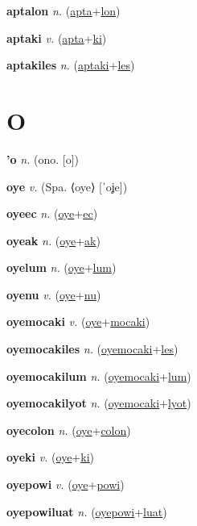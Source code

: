 \textbf{\hypertarget{aptalon}{aptalon}} \textit{n.} (\hyperlink{apta}{apta}+\allowbreak \hyperlink{lon}{lon})


\textbf{\hypertarget{aptaki}{aptaki}} \textit{v.} (\hyperlink{apta}{apta}+\allowbreak \hyperlink{ki}{ki})


\textbf{\hypertarget{aptakiles}{aptakiles}} \textit{n.} (\hyperlink{aptaki}{aptaki}+\allowbreak \hyperlink{les}{les})


\section{O}

\textbf{\hypertarget{'o}{'o}} \textit{n.} (ono. [o])


\textbf{\hypertarget{oye}{oye}} \textit{v.} (Spa. ⟨oye⟩ [ˈoʝe])


\textbf{\hypertarget{oyeec}{oyeec}} \textit{n.} (\hyperlink{oye}{oye}+\allowbreak \hyperlink{ec}{ec})


\textbf{\hypertarget{oyeak}{oyeak}} \textit{n.} (\hyperlink{oye}{oye}+\allowbreak \hyperlink{ak}{ak})


\textbf{\hypertarget{oyelum}{oyelum}} \textit{n.} (\hyperlink{oye}{oye}+\allowbreak \hyperlink{lum}{lum})


\textbf{\hypertarget{oyenu}{oyenu}} \textit{v.} (\hyperlink{oye}{oye}+\allowbreak \hyperlink{nu}{nu})


\textbf{\hypertarget{oyemocaki}{oyemocaki}} \textit{v.} (\hyperlink{oye}{oye}+\allowbreak \hyperlink{mocaki}{mocaki})


\textbf{\hypertarget{oyemocakiles}{oyemocakiles}} \textit{n.} (\hyperlink{oyemocaki}{oyemocaki}+\allowbreak \hyperlink{les}{les})


\textbf{\hypertarget{oyemocakilum}{oyemocakilum}} \textit{n.} (\hyperlink{oyemocaki}{oyemocaki}+\allowbreak \hyperlink{lum}{lum})


\textbf{\hypertarget{oyemocakilyot}{oyemocakilyot}} \textit{n.} (\hyperlink{oyemocaki}{oyemocaki}+\allowbreak \hyperlink{lyot}{lyot})


\textbf{\hypertarget{oyecolon}{oyecolon}} \textit{n.} (\hyperlink{oye}{oye}+\allowbreak \hyperlink{colon}{colon})


\textbf{\hypertarget{oyeki}{oyeki}} \textit{v.} (\hyperlink{oye}{oye}+\allowbreak \hyperlink{ki}{ki})


\textbf{\hypertarget{oyepowi}{oyepowi}} \textit{v.} (\hyperlink{oye}{oye}+\allowbreak \hyperlink{powi}{powi})


\textbf{\hypertarget{oyepowiluat}{oyepowiluat}} \textit{n.} (\hyperlink{oyepowi}{oyepowi}+\allowbreak \hyperlink{luat}{luat})


